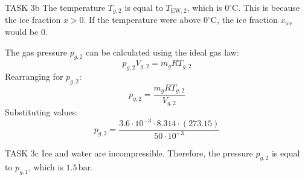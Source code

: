 TASK 3b  
The temperature \( T_{g,2} \) is equal to \( T_{\text{EW},2} \), which is \( 0^\circ\text{C} \). This is because the ice fraction \( x > 0 \). If the temperature were above \( 0^\circ\text{C} \), the ice fraction \( x_{\text{ice}} \) would be \( 0 \).  

The gas pressure \( p_{g,2} \) can be calculated using the ideal gas law:  
\[
p_{g,2} V_{g,2} = m_g R T_{g,2}
\]  
Rearranging for \( p_{g,2} \):  
\[
p_{g,2} = \frac{m_g R T_{g,2}}{V_{g,2}}
\]  
Substituting values:  
\[
p_{g,2} = \frac{3.6 \cdot 10^{-3} \cdot 8.314 \cdot (273.15)}{50 \cdot 10^{-3}}
\]  

TASK 3c  
Ice and water are incompressible. Therefore, the pressure \( p_{g,2} \) is equal to \( p_{g,1} \), which is \( 1.5 \, \text{bar} \).